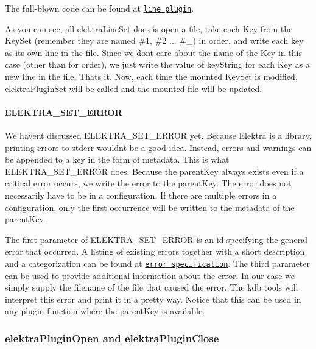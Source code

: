 The full-\/blown code can be found at \href{https://libelektra.org/tree/master/src/plugins/line/line.c}{\tt line plugin}.

As you can see, all {\ttfamily elektra\+Line\+Set} does is open a file, take each {\ttfamily Key} from the {\ttfamily Key\+Set} (remember they are named {\ttfamily \#1}, {\ttfamily \#2} ... {\ttfamily \#\+\_}) in order, and write each key as its own line in the file. Since we don\textquotesingle{}t care about the name of the {\ttfamily Key} in this case (other than for order), we just write the value of {\ttfamily key\+String} for each {\ttfamily Key} as a new line in the file. That\textquotesingle{}s it. Now, each time the mounted {\ttfamily Key\+Set} is modified, {\ttfamily elektra\+Plugin\+Set} will be called and the mounted file will be updated.

\paragraph*{{\ttfamily E\+L\+E\+K\+T\+R\+A\+\_\+\+S\+E\+T\+\_\+\+E\+R\+R\+OR}}

We haven\textquotesingle{}t discussed {\ttfamily E\+L\+E\+K\+T\+R\+A\+\_\+\+S\+E\+T\+\_\+\+E\+R\+R\+OR} yet. Because Elektra is a library, printing errors to stderr wouldn\textquotesingle{}t be a good idea. Instead, errors and warnings can be appended to a key in the form of metadata. This is what {\ttfamily E\+L\+E\+K\+T\+R\+A\+\_\+\+S\+E\+T\+\_\+\+E\+R\+R\+OR} does. Because the parent\+Key always exists even if a critical error occurs, we write the error to the parent\+Key. The error does not necessarily have to be in a configuration. If there are multiple errors in a configuration, only the first occurrence will be written to the metadata of the {\ttfamily parent\+Key}.

The first parameter of {\ttfamily E\+L\+E\+K\+T\+R\+A\+\_\+\+S\+E\+T\+\_\+\+E\+R\+R\+OR} is an id specifying the general error that occurred. A listing of existing errors together with a short description and a categorization can be found at \href{https://github.com/ElektraInitiative/libelektra/blob/master/src/error/specification}{\tt error specification}. The third parameter can be used to provide additional information about the error. In our case we simply supply the filename of the file that caused the error. The kdb tools will interpret this error and print it in a pretty way. Notice that this can be used in any plugin function where the parent\+Key is available.

\subsubsection*{{\ttfamily elektra\+Plugin\+Open} and {\ttfamily elektra\+Plugin\+Close}}

